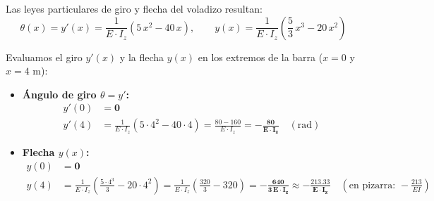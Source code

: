 {    Las leyes particulares de giro y flecha del voladizo resultan:
    \begin{equation}
        \theta(x) = y'(x) = \frac{1}{E \cdot I_z}\left(5\,x^2 - 40\,x\right), \qquad y(x) = \frac{1}{E \cdot I_z}\left(\frac{5}{3}\,x^3 - 20\,x^2\right)
    \end{equation}


    Evaluamos el giro $y'(x)$ y la flecha $y(x)$ en los extremos de la barra ($x = 0$ y $x = 4\text{ m}$):
    \begin{itemize}
        \item \textbf{Ángulo de giro $\theta = y'$:}
              \begin{align}
                  y'(0) & = \mathbf{0}                                                                                                                         \\
                  y'(4) & = \frac{1}{E \cdot I_z}\left(5 \cdot 4^2 - 40 \cdot 4\right) = \frac{80 - 160}{E \cdot I_z} = \mathbf{-\frac{80}{E \cdot I_z}} \quad (\text{rad})
              \end{align}
        \item \textbf{Flecha $y(x)$:}
              \begin{align}
                  y(0) & = \mathbf{0}                                                                                                                                                                                    \\
                  y(4) & = \frac{1}{E \cdot I_z}\left(\frac{5 \cdot 4^3}{3} - 20 \cdot 4^2\right) = \frac{1}{E \cdot I_z}\left(\frac{320}{3} - 320\right) = \mathbf{-\frac{640}{3\,E \cdot I_z} \approx -\frac{213.33}{E \cdot I_z}} \quad (\text{en pizarra: } -\frac{213}{EI})
              \end{align}
    \end{itemize}

}

